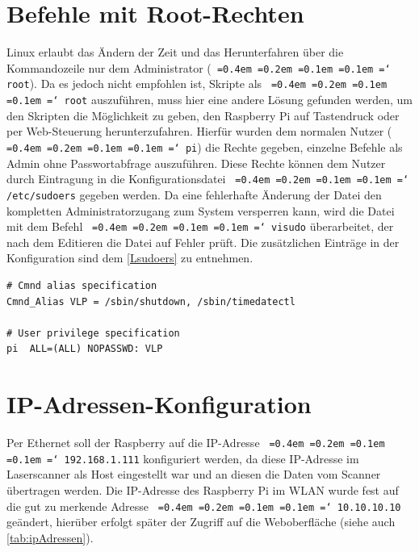 \documentclass[a4paper,12pt,bibliography=totoc, listof=totoc,titlepage,pointlessnumbers]{scrreprt}
\newcommand*\justify{%
  \fontdimen2\font=0.4em%
  \fontdimen3\font=0.2em%
  \fontdimen4\font=0.1em%
  \fontdimen7\font=0.1em%
  \hyphenchar\font=`\-%
}
\newcommand{\code}[1]{\texttt{\justify{#1}}}
\begin{document}

\section{Befehle mit Root-Rechten}
\label{s:root}
Linux erlaubt das Ändern der Zeit und das Herunterfahren über die Kommandozeile nur dem Administrator (\code{root}). Da es jedoch nicht empfohlen ist, Skripte als \code{root} auszuführen, muss hier eine andere Lösung gefunden werden, um den Skripten die Möglichkeit zu geben, den Raspberry Pi auf Tastendruck oder per Web-Steuerung herunterzufahren. Hierfür wurden dem normalen Nutzer (\code{pi}) die Rechte gegeben, einzelne Befehle  als Admin ohne Passwortabfrage auszuführen. Diese Rechte können dem Nutzer durch Eintragung in die Konfigurationsdatei \code{/etc/sudoers} gegeben werden. Da eine fehlerhafte Änderung der Datei den kompletten Administratorzugang zum System versperren kann, wird die Datei mit dem Befehl \code{visudo} überarbeitet, der nach dem Editieren die Datei auf Fehler prüft. Die zusätzlichen Einträge in der Konfiguration sind dem \autoref{Lsudoers} zu entnehmen.\citep{sudoers}

\begin{lstlisting}[caption={Änderung der \code{/etc/sudoers}}, label={Lsudoers}]
# Cmnd alias specification
Cmnd_Alias VLP = /sbin/shutdown, /sbin/timedatectl

# User privilege specification
pi	ALL=(ALL) NOPASSWD: VLP
\end{lstlisting}

\section{IP-Adressen-Konfiguration}
Per Ethernet soll der Raspberry auf die IP-Adresse \code{192.168.1.111} konfiguriert werden, da diese IP-Adresse im Laser\-scan\-ner als Host eingestellt war und an diesen die Daten vom Scanner übertragen werden. Die IP-Adresse des Raspberry Pi im WLAN wurde fest auf die gut zu merkende Adresse \code{10.10.10.10} geändert, hierüber erfolgt später der Zugriff auf die Weboberfläche (siehe auch \autoref{tab:ipAdressen}).
\end{document}
